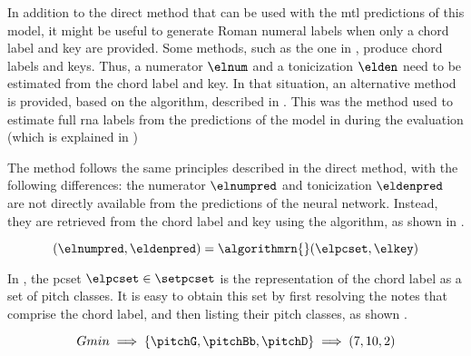 
In addition to the direct method that can be used with the
\gls{mtl} predictions of this model, it might be useful to
generate Roman numeral labels when only a chord label and
key are provided. Some methods, such as the one in
\textcite{mcleod2021modular}, produce chord labels and keys.
Thus, a numerator $\elnum$ and a tonicization $\elden$ need
to be estimated from the chord label and key. In that
situation, an alternative method is provided, based on the
\algorithmrn{} algorithm, described in
.
This was the method used to estimate full \gls{rna} labels
from the predictions of the model in
\textcite{mcleod2021modular, chen2021attend} during the
evaluation (which is explained in
)

The method follows the same principles described in the
direct method, with the following differences: the numerator
$\elnumpred$ and tonicization $\eldenpred$ are not directly
available from the predictions of the neural network.
Instead, they are retrieved from the chord label and key
using the \algorithmrn{} algorithm, as shown in
.

\begin{equation}
    \label{eq:calling_natem}
    (\elnumpred, \eldenpred) = \algorithmrn{}(\elpcset, \elkey) 
\end{equation}

In , the \gls{pcset} $\elpcset \in
\setpcset$ is the representation of the chord label as a set
of pitch classes. It is easy to obtain this set by first
resolving the notes that comprise the chord label, and then
listing their pitch classes, as shown
.


\begin{equation}
    \label{eq:indirect_method_pcset}
    Gmin \implies \{\pitchG, \pitchBb, \pitchD\} \implies (7, 10, 2)
\end{equation} 
